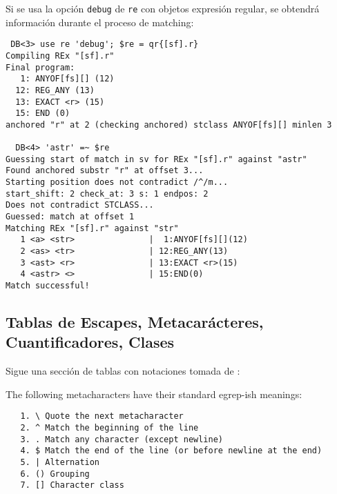 Si se usa la opción \verb|debug| de \verb|re| con 
objetos expresión regular, se obtendrá información durante el proceso de 
matching:
\begin{verbatim}
 DB<3> use re 'debug'; $re = qr{[sf].r}
Compiling REx "[sf].r"
Final program:
   1: ANYOF[fs][] (12)
  12: REG_ANY (13)
  13: EXACT <r> (15)
  15: END (0)
anchored "r" at 2 (checking anchored) stclass ANYOF[fs][] minlen 3

  DB<4> 'astr' =~ $re
Guessing start of match in sv for REx "[sf].r" against "astr"
Found anchored substr "r" at offset 3...
Starting position does not contradict /^/m...
start_shift: 2 check_at: 3 s: 1 endpos: 2
Does not contradict STCLASS...
Guessed: match at offset 1
Matching REx "[sf].r" against "str"
   1 <a> <str>               |  1:ANYOF[fs][](12)
   2 <as> <tr>               | 12:REG_ANY(13)
   3 <ast> <r>               | 13:EXACT <r>(15)
   4 <astr> <>               | 15:END(0)
Match successful!
\end{verbatim}

\subsection{Tablas de Escapes, Metacarácteres, Cuantificadores, Clases}
\label{section:abreviadas}
Sigue una sección de tablas con 
notaciones tomada de :



The following metacharacters have their standard egrep-ish meanings:

\begin{verbatim}
   1. \ Quote the next metacharacter
   2. ^ Match the beginning of the line
   3. . Match any character (except newline)
   4. $ Match the end of the line (or before newline at the end)
   5. | Alternation
   6. () Grouping
   7. [] Character class
\end{verbatim}


